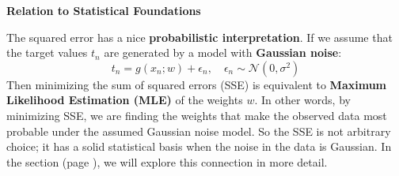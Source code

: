\begin{flushleft}
    \textcolor{Green3}{ \textbf{Relation to Statistical Foundations}}
\end{flushleft}
The squared error has a nice \textbf{probabilistic interpretation}. If we assume that the target values $t_{n}$ are generated by a model with \textbf{Gaussian noise}:
\begin{equation*}
    t_{n} = g(x_{n}; w) + \epsilon_{n}, \quad \epsilon_{n} \sim \mathcal{N}(0, \sigma^{2})
\end{equation*}
Then minimizing the sum of squared errors (SSE) is equivalent to \textbf{Maximum Likelihood Estimation (MLE)} of the weights $w$. In other words, by minimizing SSE, we are finding the weights that make the observed data most probable under the assumed Gaussian noise model. So the SSE is not arbitrary choice; it has a solid statistical basis when the noise in the data is Gaussian. In the section  (page \pageref{sec:maximum-likelihood-estimation}), we will explore this connection in more detail.